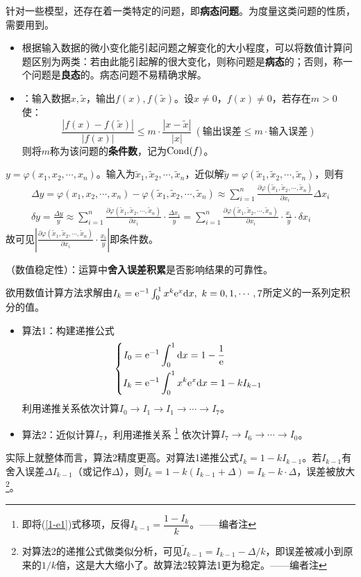 \entry 针对一些模型，还存在着一类特定的问题，即\textbf{病态问题}。为度量这类问题的性质，需要用到。
\begin{itemize}\tl
    \item 根据输入数据的微小变化能引起问题之解变化的大小程度，可以将数值计算问题区别为两类：若由此能引起解的很大变化，则称问题是\textbf{病态}的；否则，称一个问题是\textbf{良态}的。病态问题不易精确求解。
    \item {}：输入数据$x,\tilde{x}$，输出$f(x),f(\tilde{x})$。设$x\neq0$，$f(x)\neq0$，若存在$m>0$使：
    \[\frac{|f(x)-f(\tilde{x})|}{|f(x)|}\leq m\cdot\frac{|x-\tilde{x}|}{|x|}\ (\text{输出误差}\leq m\cdot\text{输入误差})\]
    则将$m$称为该问题的\textbf{条件数}，记为$\operatorname{Cond}(f)$。
\end{itemize}

\example $y=\varphi(x_1,x_2,\cdots,x_n)$。输入为$\tilde{x}_1,\tilde{x}_2,\cdots,\tilde{x}_n$，近似解$\tilde{y}=\varphi(\tilde{x}_1,\tilde{x}_2,\cdots,\tilde{x}_n)$，则有
\begin{gather}
\Delta y=\varphi(x_1,x_2,\cdots,x_n)-\varphi(\tilde{x}_1,\tilde{x}_2,\cdots,\tilde{x}_n)
\approx\sum_{i=1}^n\frac{\partial\varphi(\tilde{x}_1,\tilde{x}_2,\cdots,\tilde{x}_n)}{\partial x_i}\Delta x_i\\
\delta y=\frac{\Delta y}{y}\approx\sum_{i=1}^n\frac{\partial\varphi(\tilde{x}_1,\tilde{x}_2,\cdots,\tilde{x}_n)}{\partial x_i}\cdot\frac{\Delta x_i}{y}
=\sum_{i=1}^n\frac{\partial\varphi(\tilde{x}_1,\tilde{x}_2,\cdots,\tilde{x}_n)}{\partial x_i}\cdot\frac{x_i}{y}\cdot\delta x_i
\end{gather}
故可见$\left|\frac{\partial\varphi(\tilde{x}_1,\tilde{x}_2,\cdots,\tilde{x}_n)}{\partial x_i}\cdot\frac{x_i}{y}\right|$即条件数。

\entry {}（数值稳定性）：运算中\textbf{舍入误差积累}是否影响结果的可靠性。

\example 欲用数值计算方法求解由$I_k=\e^{-1}\int_0^1x^k\e^x\di x,\ k=0,1,\cdots,7$所定义的一系列定积分的值。
\begin{itemize}\tl
    \item 算法1：构建递推公式
    \begin{equation}\label{1-e1}
    \left\{
    \begin{aligned}
    I_0&=\mathrm{e}^{-1}\int_0^1\mathrm{d} x=1-\dfrac1{\mathrm{e}}\\
    I_k&=\mathrm{e}^{-1}\int_0^1x^k\mathrm{e}^x\mathrm{d} x=1-kI_{k-1}
    \end{aligned}
    \right.
    \end{equation}
    利用递推关系依次计算$I_0\rightarrow I_1\rightarrow I_1\rightarrow\cdots\rightarrow I_7$。
    \item 算法2：近似计算$I_7$，利用递推关系
    \footnote{即将(\ref{1-e1})式移项，反得$I_{k-1}=\dfrac{1-I_k}{k}$。——编者注}
    依次计算$I_7\rightarrow I_6\rightarrow\cdots\rightarrow I_0$。
\end{itemize}
实际上就整体而言，算法2精度更高。对算法1递推公式$I_k=1-kI_{k-1}$。若$I_{k-1}$有舍入误差$\Delta I_{k-1}$（或记作$\Delta$），则$\tilde{I}_k=1-k(I_{k-1}+\Delta)=I_k-k\cdot\Delta$，误差被放大
\footnote{对算法2的递推公式做类似分析，可见$\tilde{I}_{k-1}=I_{k-1}-\Delta/k$，即误差被减小到原来的$1/k$倍，这是大大缩小了。故算法2较算法1更为稳定。——编者注}。
